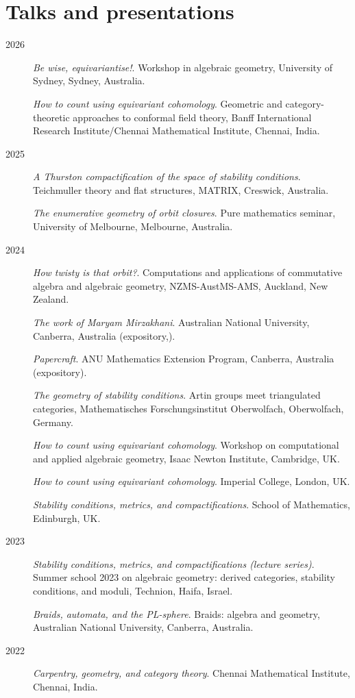 \documentclass[11pt]{article}
\begin{document}
\section*{Talks and presentations}
\label{sec:orgd83aab0}

\label{orga48af72}
\begin{description}
\item[{2026}] \emph{Be wise, equivariantise!}.
Workshop in algebraic geometry, University of Sydney, Sydney, Australia.

\emph{How to count using equivariant cohomology}.
Geometric and category-theoretic approaches to conformal field theory, Banff International Research Institute/Chennai Mathematical Institute, Chennai, India.
\item[{2025}] \emph{A Thurston compactification of the space of stability conditions}.
Teichmuller theory and flat structures, MATRIX, Creswick, Australia.

\emph{The enumerative geometry of orbit closures}.
Pure mathematics seminar, University of Melbourne, Melbourne, Australia.
\item[{2024}] \emph{How twisty is that orbit?}.
Computations and applications of commutative algebra and algebraic geometry, NZMS-AustMS-AMS, Auckland, New Zealand.

\emph{The work of Maryam Mirzakhani}.
Australian National University, Canberra, Australia (expository,).

\emph{Papercraft}.
ANU Mathematics Extension Program, Canberra, Australia (expository).

\emph{The geometry of stability conditions}.
Artin groups meet triangulated categories, Mathematisches Forschungsinstitut Oberwolfach, Oberwolfach, Germany.

\emph{How to count using equivariant cohomology}.
Workshop on computational and applied algebraic geometry, Isaac Newton Institute, Cambridge, UK.

\emph{How to count using equivariant cohomology}.
Imperial College, London, UK.

\emph{Stability conditions, metrics, and compactifications}.
School of Mathematics, Edinburgh, UK.
\item[{2023}] \emph{Stability conditions, metrics, and compactifications (lecture series)}.
Summer school 2023 on algebraic geometry: derived categories, stability conditions, and moduli, Technion, Haifa, Israel.

\emph{Braids, automata, and the PL-sphere}.
Braids: algebra and geometry, Australian National University, Canberra, Australia.
\item[{2022}] \emph{Carpentry, geometry, and category theory}.
Chennai Mathematical Institute, Chennai, India.


\end{description}
\end{document}
